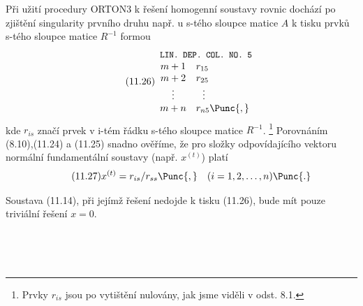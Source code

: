 Při užití procedury ORTON3 k řešení homogenní soustavy rovnic
dochází po zjištění singularity prvního druhu např. u s-tého
sloupce matice $A$ k tisku prvků s-tého sloupce matice
$R^{-1}$ formou
%
\begin{align*}
  \tag{11.26}
  \begin{array}{cl}
  \multicolumn{2}{l}{\small\texttt{LIN. DEP. COL. NO. 5}} \\
  m+1 & r_{15} \\
  m+2 & r_{25} \\
  \vdots & ~~\vdots \\
  m+n & r_{n5}\Punc{,} \\
  \end{array}
\end{align*}
%
kde  $r_{is}$ značí prvek v i-tém řádku s-tého sloupce matice
$R^{-1}$.%
\footnote{
Prvky $r_{is}$  jsou po vytištění nulovány, jak jsme viděli v
odst. 8.1.
}
%
Porovnáním (8.10),(11.24) a (11.25) snadno ověříme, že pro
složky odpovídajícího vektoru normální fundamentální soustavy
(např. $x^{(t)}$) platí
%
\begin{align*}
  \tag{11.27}
  x^{(t)} = r_{is}/r_{ss} \Punc{,} \quad(i=1,2,\ldots,n) \Punc{.}
\end{align*}

Soustava (11.14), při jejímž řešení nedojde k tisku (11.26),
bude mít pouze triviální řešení $x=0$.

~

\noindent
{}

~

